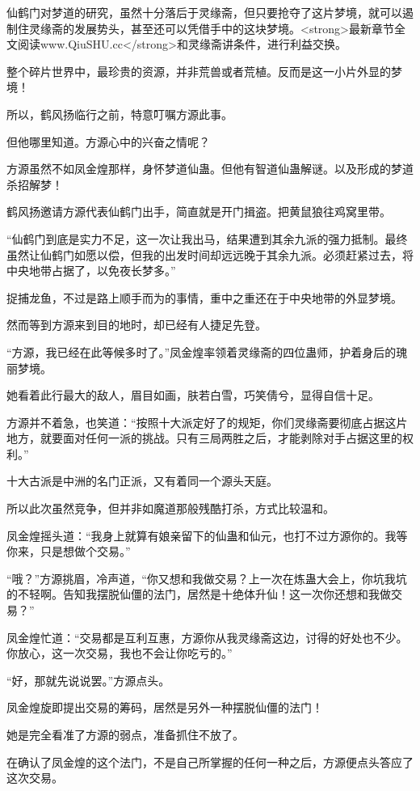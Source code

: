 \begin{this_body}
仙鹤门对梦道的研究，虽然十分落后于灵缘斋，但只要抢夺了这片梦境，就可以遏制住灵缘斋的发展势头，甚至还可以凭借手中的这块梦境。<strong>最新章节全文阅读www.QiuSHU.cc</strong>和灵缘斋讲条件，进行利益交换。

整个碎片世界中，最珍贵的资源，并非荒兽或者荒植。反而是这一小片外显的梦境！

所以，鹤风扬临行之前，特意叮嘱方源此事。

但他哪里知道。方源心中的兴奋之情呢？

方源虽然不如凤金煌那样，身怀梦道仙蛊。但他有智道仙蛊解谜。以及形成的梦道杀招解梦！

鹤风扬邀请方源代表仙鹤门出手，简直就是开门揖盗。把黄鼠狼往鸡窝里带。

“仙鹤门到底是实力不足，这一次让我出马，结果遭到其余九派的强力抵制。最终虽然让仙鹤门如愿以偿，但我的出发时间却远远晚于其余九派。必须赶紧过去，将中央地带占据了，以免夜长梦多。”

捉捕龙鱼，不过是路上顺手而为的事情，重中之重还在于中央地带的外显梦境。

然而等到方源来到目的地时，却已经有人捷足先登。

“方源，我已经在此等候多时了。”凤金煌率领着灵缘斋的四位蛊师，护着身后的瑰丽梦境。

她看着此行最大的敌人，眉目如画，肤若白雪，巧笑倩兮，显得自信十足。

方源并不着急，也笑道：“按照十大派定好了的规矩，你们灵缘斋要彻底占据这片地方，就要面对任何一派的挑战。只有三局两胜之后，才能剥除对手占据这里的权利。”

十大古派是中洲的名门正派，又有着同一个源头天庭。

所以此次虽然竞争，但并非如魔道那般残酷打杀，方式比较温和。

凤金煌摇头道：“我身上就算有娘亲留下的仙蛊和仙元，也打不过方源你的。我等你来，只是想做个交易。”

“哦？”方源挑眉，冷声道，“你又想和我做交易？上一次在炼蛊大会上，你坑我坑的不轻啊。告知我摆脱仙僵的法门，居然是十绝体升仙！这一次你还想和我做交易？”

凤金煌忙道：“交易都是互利互惠，方源你从我灵缘斋这边，讨得的好处也不少。你放心，这一次交易，我也不会让你吃亏的。”

“好，那就先说说罢。”方源点头。

凤金煌旋即提出交易的筹码，居然是另外一种摆脱仙僵的法门！

她是完全看准了方源的弱点，准备抓住不放了。

在确认了凤金煌的这个法门，不是自己所掌握的任何一种之后，方源便点头答应了这次交易。


\end{this_body}
